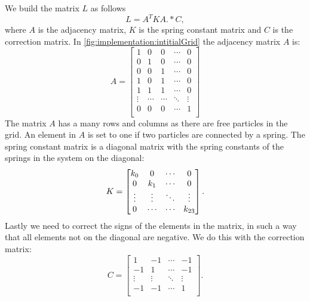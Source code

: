 	We build the matrix $L$ as follows
	\begin{equation}\label{eq:implementation:LHS}
		L = A^T K A .* C,
	\end{equation}
	where $A$ is the adjacency matrix, $K$ is the spring constant matrix and $C$ is the correction matrix. In \cref{fig:implementation:intitialGrid} the adjacency matrix $A$ is:
	\begin{equation}\label{eq:implementation:adjacency}
		A = \begin{bmatrix}
			1 		& 0 		& 0 		& \cdots 	& 0\\
			0 		& 1 		& 0 		& \cdots 	& 0\\
			0 		& 0 		& 1 		& \cdots 	& 0\\
			1 		& 0 		& 1 		& \cdots 	& 0\\
			1 		& 1 		& 1 		& \cdots 	& 0\\
			\vdots	& \cdots 	& \cdots 	& \ddots 	& \vdots\\
			0 		& 0 		& 0 		& \cdots 	& 1\\
		\end{bmatrix}
	\end{equation}
	The matrix $A$ has a many rows and columns as there are free particles in the grid. An element in $A$ is set to one if two particles are connected by a spring. 
	The spring constant matrix is a diagonal matrix with the spring constants of the springs in the system on the diagonal:
	\begin{equation}\label{eq:implementation:springConstantMatrix}
		K = \begin{bmatrix}
			k_{0} 	& 0 			& \cdots & 0\\
			0 			& k_{1}	& \cdots & 0\\	
			\vdots 		& \vdots		& \ddots & \vdots\\
			0 			& \cdots		& \cdots & k_{23}\\
		\end{bmatrix}.
	\end{equation}	
	Lastly we need to correct the signs of the elements in the matrix, in such a way that all elements not on the diagonal are negative. We do this with the correction matrix:
	\begin{equation}\label{eq:implementation:correctionMatrix}
		C = \begin{bmatrix}
			1 			& -1 			& \cdots & -1\\
			-1 			& 1				& \cdots & -1\\	
			\vdots 		& \vdots		& \ddots & \vdots\\
			-1 			& -1			& \cdots & 1\\		
		\end{bmatrix}.
	\end{equation}

